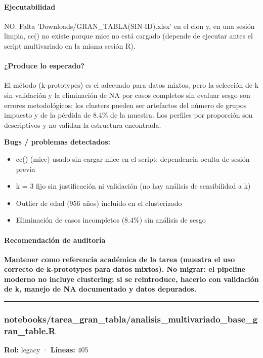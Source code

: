 \paragraph{Ejecutabilidad}
NO. Falta 'Downloads/GRAN\_TABLA(SIN ID).xlsx' en el clon y, en una sesión limpia, cc() no existe porque mice no está cargado (depende de ejecutar antes el script multivariado en la misma sesión R).

\paragraph{¿Produce lo esperado?}
El método (k-prototypes) es el adecuado para datos mixtos, pero la selección de k sin validación y la eliminación de NA por casos completos sin evaluar sesgo son errores metodológicos: los clusters pueden ser artefactos del número de grupos impuesto y de la pérdida de 8.4\% de la muestra. Los perfiles por proporción son descriptivos y no validan la estructura encontrada.

\begin{tcolorbox}[riesgo]
\textbf{Bugs / problemas detectados:}
\begin{itemize}
  \item cc() (mice) usado sin cargar mice en el script: dependencia oculta de sesión previa
  \item k = 3 fijo sin justificación ni validación (no hay análisis de sensibilidad a k)
  \item Outlier de edad (956 años) incluido en el clusterizado
  \item Eliminación de casos incompletos (8.4\%) sin análisis de sesgo
\end{itemize}
\end{tcolorbox}

\paragraph{Recomendación de auditoría}
\textbf{Mantener como referencia académica de la tarea (muestra el uso correcto de k-prototypes para datos mixtos). No migrar: el pipeline moderno no incluye clustering; si se reintroduce, hacerlo con validación de k, manejo de NA documentado y datos depurados.}

\medskip
\hrule

\subsubsection{notebooks/tarea\_gran\_tabla/analisis\_multivariado\_base\_gran\_table.R}
\textbf{Rol:} legacy · \textbf{Líneas:} 405


